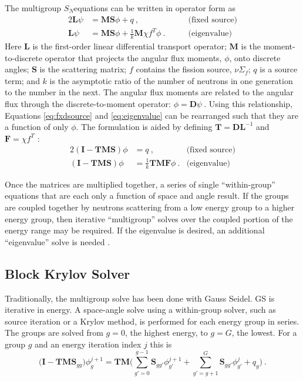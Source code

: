 \documentclass[preprint,12pt]{elsarticle}
\newcommand{\Sn}{\ensuremath{S_N}}
\newcommand{\Macro}{\ensuremath{\Sigma}}
\newcommand{\ve}[1]{\ensuremath{\mathbf{#1}}}
\begin{document}
%
The multigroup \Sn equations can be written in operator form as
%
\begin{alignat}{2}
  \ve{L}\psi &= \ve{MS}\phi + q \:, \qquad &\text{(fixed source)} \label{eq:fxdsource} \\
  \ve{L}\psi &= \ve{MS}\phi + \frac{1}{k}\ve{M}\chi f^{T}\phi \:. \qquad &\text{(eigenvalue)} \label{eq:eigenvalue}
\end{alignat}
%
Here $\ve{L}$ is the first-order linear differential transport operator; $\ve{M}$ is the moment-to-discrete operator that projects the angular flux moments, $\phi$, onto discrete angles; $\ve{S}$ is the scattering matrix; $f$ contains the fission source, $\nu \Macro_{f}$; $q$ is a source term; and $k$ is the asymptotic ratio of the number of neutrons in one generation to the number in the next. The angular flux moments are related to the angular flux through the discrete-to-moment operator: $\phi = \mathbf{D} \psi \:$. Using this relationship, Equations \eqref{eq:fxdsource} and \eqref{eq:eigenvalue} can be rearranged such that they are a function of only $\phi$. The formulation is aided by defining $\ve{T} = \ve{DL}^{-1}$ and $\ve{F} = \chi f^{T}$ \cite{Evans2011}:
%
\begin{alignat}{2}
  (\ve{I} - \ve{TMS})\phi &= q \:, \qquad &\text{(fixed source)} \label{eq:OperatorFxdForm} \\
  (\ve{I} - \ve{TMS})\phi &= \frac{1}{k} \ve{TMF} \phi \:. &\text{(eigenvalue)} \label{eq:OperatorEvalForm}
\end{alignat}

Once the matrices are multiplied together, a series of single ``within-group'' equations that are each only a function of space and angle result. If the groups are coupled together by neutrons scattering from a low energy group to a higher energy group, then iterative ``multigroup'' solves over the coupled portion of the energy range may be required. If the eigenvalue is desired, an additional ``eigenvalue'' solve is needed \cite{Evans2009}. 

\subsection{Block Krylov Solver}
\label{sec:blockkrylov}
Traditionally, the multigroup solve has been done with Gauss Seidel. GS is iterative in energy. A space-angle solve using a within-group solver, such as source iteration or a Krylov method, is performed for each energy group in series. The groups are solved from $g=0$, the highest energy, to $g=G$, the lowest. For a group $g$ and an energy iteration index $j$ this is \cite{Evans2010}
%
\begin{equation}
  \bigl( \ve{I} - \ve{TMS}_{gg} \bigr) \phi^{j+1}_{g} = \ve{TM} \bigl( \sum_{g'=0}^{g-1}\ve{S}_{gg'}\phi^{j+1}_{g'} + \sum_{g'=g+1}^{G} \ve{S}_{gg'}\phi^{j}_{g'}  + q_{g} \bigr)  \:.
 \label{eq:up-GS}
\end{equation}
\end{document}
